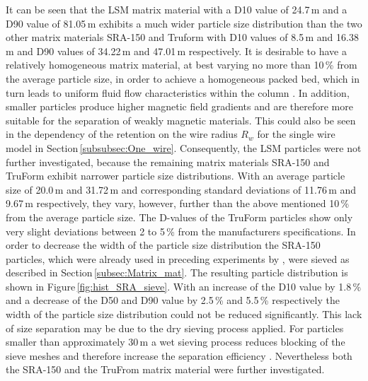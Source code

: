 It can be seen that the LSM matrix material with a D10 value of 24.7\,\textmu m and a D90 value of 81.05\,\textmu m exhibits a much wider particle size distribution than the two other matrix materials SRA-150 and Truform with D10 values of  8.5\,\textmu m and 16.38\,\textmu m and D90 values of 34.22\,\textmu m and 47.01\,\textmu m respectively. It is desirable to have a relatively homogeneous matrix material, at best varying no more than 10\,\% from the average particle size, in order to achieve a homogeneous packed bed, which in turn leads to uniform fluid flow characteristics within the column \cite{miltenyi1997magnetic}. In addition, smaller particles produce higher magnetic field gradients and are therefore more suitable for the separation of weakly magnetic materials. This could also be seen in the dependency of the retention on the wire radius $R_{w}$ for the single wire model in Section\,\ref{subsubsec:One_wire}. Consequently, the LSM particles were not further investigated, because the remaining matrix materials SRA-150 and TruForm exhibit narrower particle size distributions. With an average particle size of 20.0\,\textmu m and  31.72\,\textmu m and corresponding standard deviations of 11.76\,\textmu m and 9.67\,\textmu m respectively, they vary, however, further than the above mentioned 10\,\% from the average particle size. The D-values of the TruForm particles show only very slight deviations between 2 to 5\,\% from the manufacturers specifications. In order to decrease the width of the particle size distribution the SRA-150 particles, which were already used in preceding experiments by \cite{AndreMaster}, were sieved as described in Section\,\ref{subsec:Matrix_mat}. The resulting particle distribution is shown in Figure\,\ref{fig:hist_SRA_sieve}. With an increase of the D10 value by 1.8\,\% and a decrease of the D50 and D90 value by 2.5\,\% and 5.5\,\%  respectively the width of the particle size distribution could not be reduced significantly. This lack of size separation may be due to the dry sieving process applied. For particles smaller than approximately 30\,\textmu m a wet sieving process reduces blocking of the sieve meshes and therefore increase the separation efficiency \cite{RetschSieve}. Nevertheless both the SRA-150 and the TruFrom matrix material were further investigated. 

